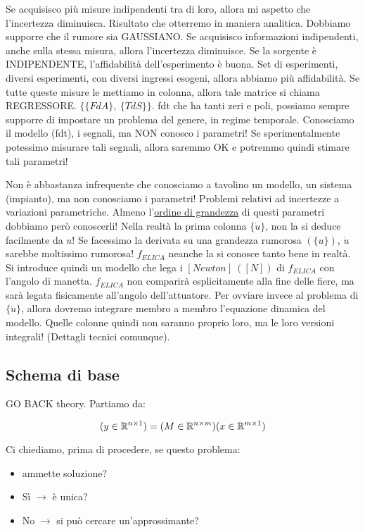 Se acquisisco più misure indipendenti tra di loro, allora mi aspetto che l'incertezza diminuisca. Risultato che otterremo in maniera analitica. Dobbiamo supporre che il rumore sia GAUSSIANO. Se acquisisco informazioni indipendenti, anche sulla stessa misura, allora l'incertezza diminuisce. Se la sorgente è INDIPENDENTE, l'affidabilità dell'esperimento è buona. Set di esperimenti, diversi esperimenti, con diversi ingressi esogeni, allora abbiamo più affidabilità. Se tutte queste misure le mettiamo in colonna, allora tale matrice si chiama REGRESSORE. $\{\{FdA\},\ \{TdS\}\}$. fdt che ha tanti zeri e poli, possiamo sempre supporre di impostare un problema del genere, in regime temporale. Conosciamo il modello (fdt), i segnali, ma NON conosco i parametri! Se sperimentalmente potessimo misurare tali segnali, allora saremmo OK e potremmo quindi stimare tali parametri!

Non è abbastanza infrequente che conosciamo a tavolino un modello, un sistema (impianto), ma non conosciamo i parametri! Problemi relativi ad incertezze a variazioni parametriche. Almeno l'\underline{ordine di grandezza} di questi parametri dobbiamo però conoscerli! Nella realtà la prima colonna $\{\dot{u}\}$, non la si deduce facilmente da $u$! Se facessimo la derivata su una grandezza rumorosa $(\{u\})$, $\dot{u}$ sarebbe moltissimo rumorosa! $f_{ELICA}$ neanche la si conosce tanto bene in realtà. Si introduce quindi un modello che lega i $[Newton]\ ([N])$ di $f_{ELICA}$ con l'angolo di manetta. $f_{ELICA}$ non comparirà esplicitamente alla fine delle fiere, ma sarà legata fisicamente all'angolo dell'attuatore. Per ovviare invece al problema di $\{\dot{u}\}$, allora dovremo integrare membro a membro l'equazione dinamica del modello. Quelle colonne quindi non saranno proprio loro, ma le loro versioni integrali! (Dettagli tecnici comunque).

\subsection{Schema di base}

GO BACK theory. Partiamo da:

\[
	(y\in\mathbb{R}^{n\times 1}) = (M\in\mathbb{R}^{n\times m})(x\in\mathbb{R}^{m\times 1})
\]

Ci chiediamo, prima di procedere, se questo problema:

\begin{itemize}

\item ammette soluzione? 
\item Sì $\rightarrow$ è unica?
\item No $\rightarrow$ si può cercare un'approssimante?
\end{itemize}

